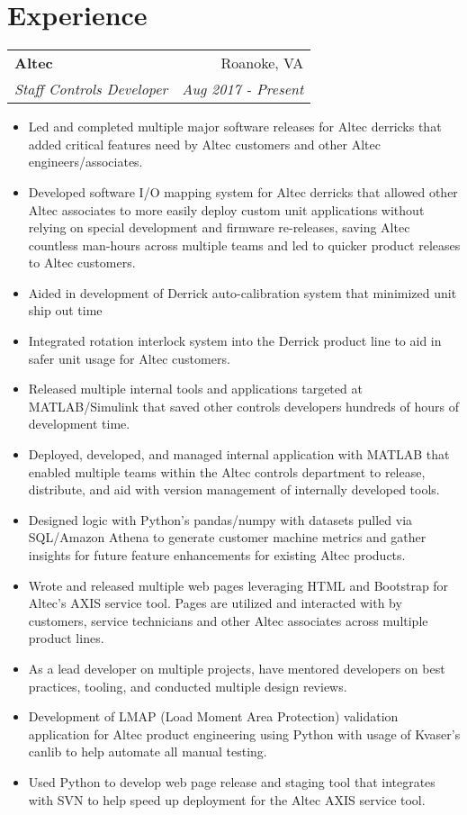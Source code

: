 \documentclass[letterpaper,11pt]{article}
\makeatletter
\newcommand{\resumeItemNoTitle}[1]{
  \item\small{
    {#1 \vspace{-2pt}}
  }
}
\newcommand{\resumeHeading}[4]{
    \begin{tabular*}{0.99\textwidth}[t]{l@{\extracolsep{\fill}}r}
      \textbf{#1} & #2 \\
      \textit{\small#3} & \textit{\small #4} \\
    \end{tabular*}\vspace{-2pt}
}
\newcommand{\resumeItemListStart}{\begin{itemize}[itemsep=0em]}
\newcommand{\resumeItemListEnd}{\end{itemize}\vspace{-5pt}}
\makeatother
\begin{document}
\section{Experience}
    \resumeHeading
      {Altec}{Roanoke, VA}
      {Staff Controls Developer}{Aug 2017 - Present}
      \resumeItemListStart
        \resumeItemNoTitle{
          Led and completed multiple major software releases for Altec derricks that added critical features need by Altec customers and other Altec engineers/associates.
        }
        \resumeItemNoTitle{
          Developed software I/O mapping system for Altec derricks that allowed other Altec associates to more easily deploy custom unit applications without relying on special development and firmware re-releases, saving Altec countless man-hours across multiple teams and led to quicker product releases to Altec customers.
        }
        \resumeItemNoTitle{
          Aided in development of Derrick auto-calibration system that minimized unit ship out time
        }
        \resumeItemNoTitle{
          Integrated rotation interlock system into the Derrick product line to aid in safer unit usage for Altec customers.
        }
        \resumeItemNoTitle{
          Released multiple internal tools and applications targeted at MATLAB/Simulink that saved other controls developers hundreds of hours of development time.
        }
        \resumeItemNoTitle{
          Deployed, developed, and managed internal application with MATLAB that enabled multiple teams within the Altec controls department to release, distribute, and aid with version management of internally developed tools.
        }
        \resumeItemNoTitle{
          Designed logic with Python's pandas/numpy with datasets pulled via SQL/Amazon Athena to generate customer machine metrics and gather insights for future feature enhancements for existing Altec products.
        }
        \resumeItemNoTitle{
          Wrote and released multiple web pages leveraging HTML and Bootstrap for Altec's AXIS service tool. Pages are utilized and interacted with by customers, service technicians and other Altec associates across multiple product lines.
        }
        \resumeItemNoTitle{
          As a lead developer on multiple projects, have mentored developers on best practices, tooling, and conducted multiple design reviews.
        }
        \resumeItemNoTitle{
          Development of LMAP (Load Moment Area Protection) validation application for Altec product engineering using Python with usage of Kvaser's canlib to help automate all manual testing.
        }
        \resumeItemNoTitle{
          Used Python to develop web page release and staging tool that integrates with SVN to help speed up deployment for the Altec AXIS service tool.
        }
      \resumeItemListEnd
\end{document}

